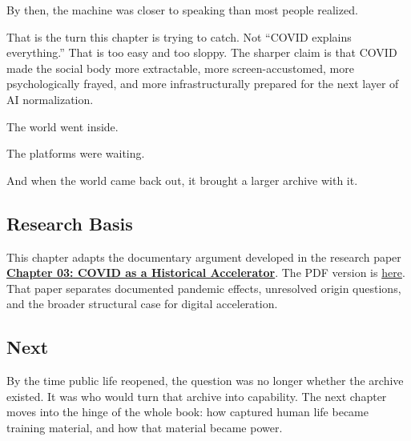 \documentclass[
  american,
  12pt,
  letterpaper,
]{article}
\begin{document}
By then, the machine was closer to speaking than most people realized.

That is the turn this chapter is trying to catch. Not ``COVID explains
everything.'' That is too easy and too sloppy. The sharper claim is that
COVID made the social body more extractable, more screen-accustomed,
more psychologically frayed, and more infrastructurally prepared for the
next layer of AI normalization.

The world went inside.

The platforms were waiting.

And when the world came back out, it brought a larger archive with it.

\subsection{Research Basis}\label{research-basis}

This chapter adapts the documentary argument developed in the research
paper
\href{../../papers/html/03_covid-historical-accelerator_paper.html}{\textbf{Chapter
03: COVID as a Historical Accelerator}}. The PDF version is
\href{../../papers/pdf/03_covid-historical-accelerator_paper/03_covid-historical-accelerator_paper.pdf}{here}.
That paper separates documented pandemic effects, unresolved origin
questions, and the broader structural case for digital acceleration.

\subsection{Next}\label{next}

By the time public life reopened, the question was no longer whether the
archive existed. It was who would turn that archive into capability. The
next chapter moves into the hinge of the whole book: how captured human
life became training material, and how that material became power.
\end{document}
